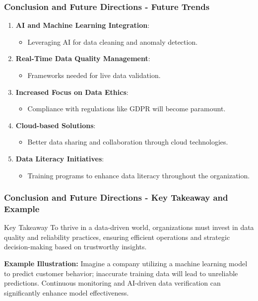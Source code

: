 \documentclass{beamer}
\begin{document}
\begin{frame}[fragile]
    \frametitle{Conclusion and Future Directions - Future Trends}
    \begin{enumerate}
        \item \textbf{AI and Machine Learning Integration}:
        \begin{itemize}
            \item Leveraging AI for data cleaning and anomaly detection.
        \end{itemize}
        
        \item \textbf{Real-Time Data Quality Management}:
        \begin{itemize}
            \item Frameworks needed for live data validation.
        \end{itemize}

        \item \textbf{Increased Focus on Data Ethics}:
        \begin{itemize}
            \item Compliance with regulations like GDPR will become paramount.
        \end{itemize}

        \item \textbf{Cloud-based Solutions}:
        \begin{itemize}
            \item Better data sharing and collaboration through cloud technologies.
        \end{itemize}

        \item \textbf{Data Literacy Initiatives}:
        \begin{itemize}
            \item Training programs to enhance data literacy throughout the organization.
        \end{itemize}
    \end{enumerate}
\end{frame}

\begin{frame}[fragile]
    \frametitle{Conclusion and Future Directions - Key Takeaway and Example}
    \begin{block}{Key Takeaway}
        To thrive in a data-driven world, organizations must invest in data quality and reliability practices, ensuring efficient operations and strategic decision-making based on trustworthy insights.
    \end{block}

    \vspace{1em}

    \textbf{Example Illustration:}
    Imagine a company utilizing a machine learning model to predict customer behavior; inaccurate training data will lead to unreliable predictions. Continuous monitoring and AI-driven data verification can significantly enhance model effectiveness.
\end{frame}
\end{document}
